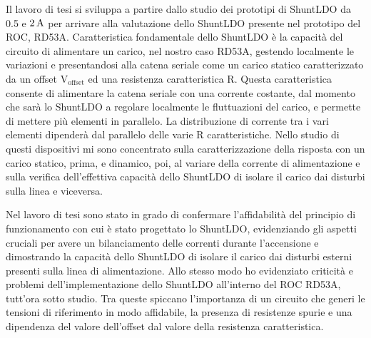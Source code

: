 \documentclass[a4paper,12pt,italian]{article}
\begin{document}
Il lavoro di tesi si sviluppa a partire dallo studio dei prototipi di ShuntLDO da 0.5 e $2 \rm \, A$ per arrivare alla valutazione dello ShuntLDO presente nel prototipo del ROC, RD53A. 
Caratteristica fondamentale dello ShuntLDO è la capacità del circuito di alimentare un carico, nel nostro caso RD53A, gestendo localmente le variazioni e presentandosi alla catena seriale come un carico statico caratterizzato da un offset $\mathrm{V_{offset}}$ ed una resistenza caratteristica R. 
Questa caratteristica consente di alimentare la catena seriale con una corrente costante, dal momento che sarà lo ShuntLDO a regolare localmente le fluttuazioni del carico, e permette di mettere più elementi in parallelo.
La distribuzione di corrente tra i vari elementi dipenderà dal parallelo delle varie R caratteristiche. 
Nello studio di questi dispositivi mi sono concentrato sulla caratterizzazione della risposta con un carico statico, prima, e dinamico, poi, al variare della corrente di alimentazione e sulla verifica dell'effettiva capacità dello ShuntLDO di isolare il carico dai disturbi sulla linea e viceversa. 

Nel lavoro di tesi sono stato in grado di confermare l'affidabilità del principio
di funzionamento con cui è stato progettato lo ShuntLDO, evidenziando
gli aspetti cruciali per avere un bilanciamento delle correnti durante l'accensione e dimostrando la capacità dello ShuntLDO di isolare il carico dai disturbi esterni 
presenti sulla linea di alimentazione. 
Allo stesso modo ho evidenziato criticità e problemi dell'implementazione dello ShuntLDO all'interno del ROC RD53A, tutt'ora sotto studio. Tra queste spiccano l'importanza di un circuito che generi le tensioni di riferimento in modo affidabile, la presenza di resistenze spurie e una dipendenza del valore dell'offset dal valore della resistenza caratteristica.
\end{document}
